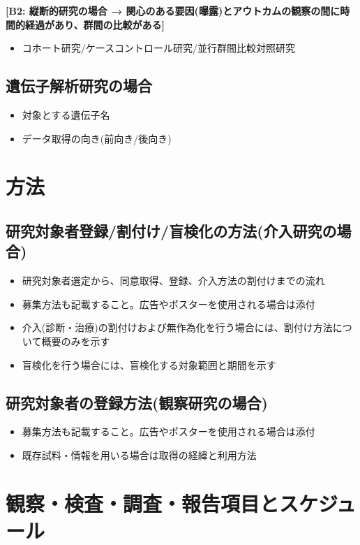 \documentclass{kyodai-protocol}
\begin{document}
\textbf{[B2: 縦断的研究の場合 → 関心のある要因(曝露)とアウトカムの観察の間に時間的経過があり、群間の比較がある]}
\begin{itemize}
\item コホート研究/ケースコントロール研究/並行群間比較対照研究
\end{itemize}

\subsection{遺伝子解析研究の場合}
\begin{itemize}
\item 対象とする遺伝子名
\item データ取得の向き(前向き/後向き)
\end{itemize}

\section{方法}

\subsection{研究対象者登録/割付け/盲検化の方法(介入研究の場合)}
\begin{itemize}
\item 研究対象者選定から、同意取得、登録、介入方法の割付けまでの流れ
\item 募集方法も記載すること。広告やポスターを使用される場合は添付
\item 介入(診断・治療)の割付けおよび無作為化を行う場合には、割付け方法について概要のみを示す
\item 盲検化を行う場合には、盲検化する対象範囲と期間を示す
\end{itemize}

\subsection{研究対象者の登録方法(観察研究の場合)}
\begin{itemize}
\item 募集方法も記載すること。広告やポスターを使用される場合は添付
\item 既存試料・情報を用いる場合は取得の経緯と利用方法
\end{itemize}

\section{観察・検査・調査・報告項目とスケジュール}
\end{document}
